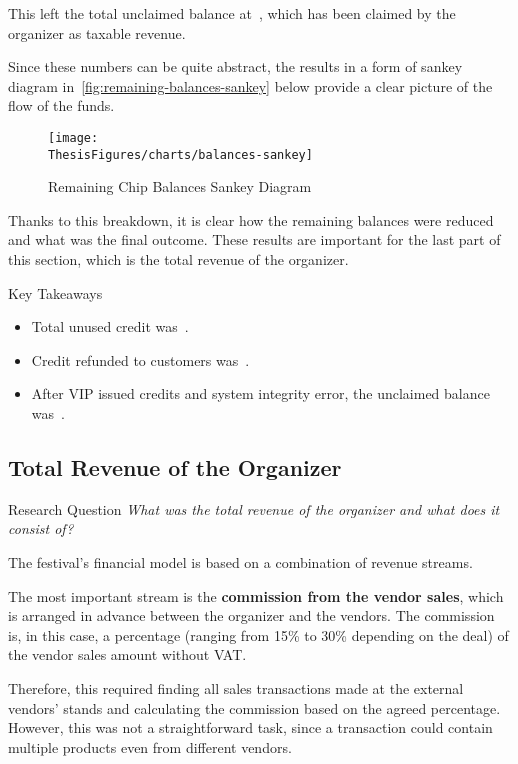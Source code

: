 This left the total unclaimed balance at~, which has been claimed by the organizer as taxable revenue.

Since these numbers can be quite abstract, the results in a form of sankey diagram in~\autoref{fig:remaining-balances-sankey} below provide a clear picture of the flow of the funds.

\begin{figure}[H]
	\centering
	\texttt{[image: \\ThesisFigures/charts/balances-sankey]}
	\caption{Remaining Chip Balances Sankey Diagram}
	\label{fig:remaining-balances-sankey}
\end{figure}

Thanks to this breakdown, it is clear how the remaining balances were reduced and what was the final outcome.
These results are important for the last part of this section, which is the total revenue of the organizer.

\begin{blue-box}{Key Takeaways}
	\begin{itemize}
		\item Total unused credit was~.
		\item Credit refunded to customers was~.
		\item After VIP issued credits and system integrity error, the unclaimed balance was~.
	\end{itemize}
\end{blue-box}

\subsection{Total Revenue of the Organizer}
\label{subsec:analysis-total-revenue}
\begin{gray-box}{Research Question}
	\textit{What was the total revenue of the organizer and what does it consist of?}
\end{gray-box}

The festival's financial model is based on a combination of revenue streams.

The most important stream is the \textbf{commission from the vendor sales}, which is arranged in advance between the organizer and the vendors.
The commission is, in this case, a percentage (ranging from 15\% to 30\% depending on the deal) of the vendor sales amount without VAT\@.

Therefore, this required finding all sales transactions made at the external vendors' stands and calculating the commission based on the agreed percentage.
However, this was not a straightforward task, since a transaction could contain multiple products even from different vendors.

